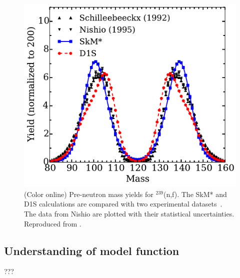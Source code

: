\begin{figure}[h]
\begin{center}
\includegraphics[width=0.6\columnwidth]{figures/fission_yields}
\caption{(Color online) Pre-neutron mass yields for $^{239}$(n,f). The SkM* 
and D1S calculations are compared with two experimental datasets~\cite{schillebeeckx_comparative_1992,nishio_measurement_1995}. The data from 
Nishio are plotted with their statistical uncertainties. Reproduced from \cite{regnier2016}.
}
\label{fig:fission_yields}
\end{center}
\end{figure}


\subsection{Understanding of model function}  \label{subsec:model_function}

  \bi
    \I ???
  \ei



